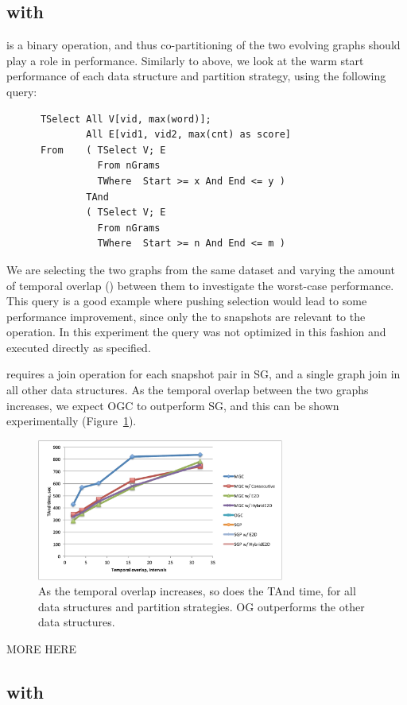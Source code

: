 
\subsection{ with }

 is a binary operation, and thus co-partitioning of the
two evolving graphs should play a role in performance.  Similarly to
 above, we look at the warm start performance of each
data structure and partition strategy, using the following query:

\begin{small}
\begin{verbatim}
      TSelect All V[vid, max(word)];
              All E[vid1, vid2, max(cnt) as score]
      From    ( TSelect V; E
                From nGrams
                TWhere  Start >= x And End <= y )
              TAnd
              ( TSelect V; E
                From nGrams
                TWhere  Start >= n And End <= m )      
\end{verbatim}
\end{small}

We are selecting the two graphs from the same dataset and varying the
amount of temporal overlap () between them to investigate
the worst-case performance.  This query is a good example where
pushing selection would lead to some performance improvement, since
only the  to  snapshots are relevant to the
operation.  In this experiment the query was not optimized in this
fashion and executed directly as specified.

 requires a join operation for each snapshot pair in SG,
and a single graph join in all other data structures.  As the temporal
overlap between the two graphs increases, we expect OGC to outperform
SG, and this can be shown experimentally (Figure~\ref{fig:tandall}).

\begin{figure}[t!]
\includegraphics[width=3.2in]{figs/tand_all_warm.pdf}
\caption{As the temporal overlap increases, so does the TAnd time, for
  all data structures and partition strategies.  OG outperforms the
  other data structures.}
\label{fig:tandall}
\end{figure}

MORE HERE

\subsection{ with }

